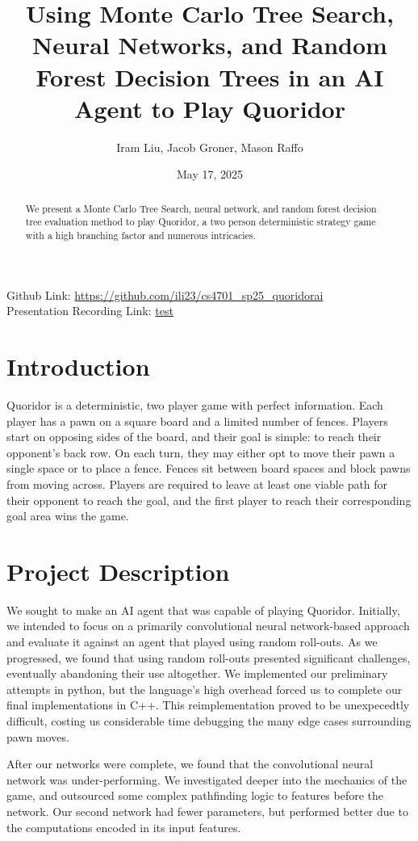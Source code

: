 \documentclass[10pt]{article}
\title{\bfseries Using Monte Carlo Tree Search, Neural Networks, and Random Forest Decision Trees in an AI Agent to Play Quoridor}
\author{
    Iram Liu, Jacob Groner, Mason Raffo
}
\date{May 17, 2025}
\newcommand{\githubLink}{\url{https://github.com/ili23/cs4701_sp25_quoridorai}}
\newcommand{\presentationLink}{\url{test}}
\begin{document}
\maketitle

\begin{abstract}We present a Monte Carlo Tree Search, neural network, and random forest decision tree evaluation method to play Quoridor, a two person deterministic strategy game with a high branching factor and numerous intricacies.
\end{abstract}
Github Link: \githubLink \\
Presentation Recording Link: \presentationLink
\section{Introduction}
Quoridor is a deterministic, two player game with perfect information. Each player has a pawn on a square board and a limited number of fences. Players start on opposing sides of the board, and their goal is simple: to reach their opponent's back row. On each turn, they may either opt to move their pawn a single space or to place a fence. Fences sit between board spaces and block pawns from moving across. Players are required to leave at least one viable path for their opponent to reach the goal, and the first player to reach their corresponding goal area wins the game.

\section{Project Description}

We sought to make an AI agent that was capable of playing Quoridor. Initially, we intended to focus on a primarily convolutional neural network-based approach and evaluate it against an agent that played using random roll-outs. As we progressed, we found that using random roll-outs presented significant challenges, eventually abandoning their use altogether. We implemented our preliminary attempts in python, but the language's high overhead forced us to complete our final implementations in C++. This reimplementation proved to be unexpecedtly difficult, costing us considerable time debugging the many edge cases surrounding pawn moves.

After our networks were complete, we found that the convolutional neural network was under-performing. We investigated deeper into the mechanics of the game, and outsourced some complex pathfinding logic to features before the network. Our second network had fewer parameters, but performed better due to the computations encoded in its input features.
\end{document}
